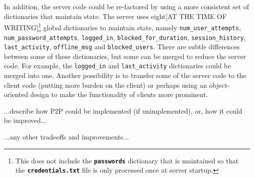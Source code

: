 \documentclass[12pt,a4paper]{article}
\begin{document}
In addition, the server code could be re-factored by using a more consistent set of dictionaries that maintain state. The server uses eight[AT THE TIME OF WRITING]\footnote{This does not include the \textbf{\tt{passwords}} dictionary that is maintained so that the \textbf{\tt{credentials.txt}} file is only processed once at server startup.} global dictionaries to maintain state, namely \verb|num_user_attempts|, \verb|num_password_attempts|, \verb|logged_in|, \verb|blocked_for_duration|, \verb|session_history|, \verb|last_activity|, \verb|offline_msg| and \verb|blocked_users|. There are subtle differences between some of these dictionaries, but some can be merged to reduce the server code. For example, the \verb|logged_in| and \verb|last_activity|  dictionaries could be merged into one. Another possibility is to transfer some of the server code to the client code (putting more burden on the client) or perhaps using an object-oriented design to make the functionality of clients more prominent.

...describe how P2P could be implemented (if unimplemented), or, how it could be improved...

...any other tradeoffs and improvements...
\end{document}
